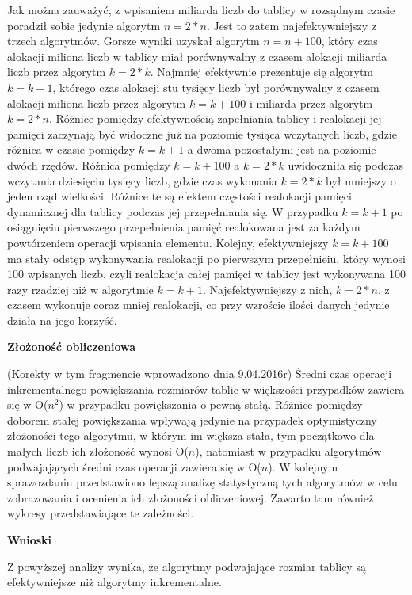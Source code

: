 \documentclass[10pt, a4paper]{article}
\begin{document}
\begin{flushleft}
Jak można zauważyć, z wpisaniem miliarda liczb do tablicy w rozsądnym czasie poradził sobie jedynie algorytm $n=2*n$. Jest to zatem najefektywniejszy z trzech algorytmów. Gorsze wyniki uzyskał algorytm $n=n+100$, który czas alokacji miliona liczb w tablicy miał porównywalny z czasem alokacji miliarda liczb przez algorytm $k=2*k$. Najmniej efektywnie prezentuje się algorytm $k=k+1$, którego czas alokacji stu tysięcy liczb był porównywalny z czasem alokacji miliona liczb przez algorytm $k=k+100$ i miliarda przez algorytm $k=2*n$. Różnice pomiędzy efektywnością zapełniania tablicy i realokacji jej pamięci zaczynają być widoczne już na poziomie tysiąca wczytanych liczb, gdzie różnica w czasie pomiędzy $k=k+1$ a dwoma pozostałymi jest na poziomie dwóch rzędów. Różnica pomiędzy $k=k+100$ a $k=2*k$ uwidoczniła się podczas wczytania dziesięciu tysięcy liczb, gdzie czas wykonania $k=2*k$ był mniejszy o jeden rząd wielkości. Różnice te są efektem częstości realokacji pamięci dynamicznej dla tablicy podczas jej przepełniania się. W przypadku $k=k+1$ po osiągnięciu pierwszego przepełnienia pamięć realokowana jest za każdym powtórzeniem operacji wpisania elementu. Kolejny, efektywniejszy $k=k+100$ ma stały odstęp wykonywania realokacji po pierwszym przepełnieiu, który wynosi 100 wpisanych liczb, czyli realokacja całej pamięci w tablicy jest wykonywana 100 razy rzadziej niż w algorytmie $k=k+1$. Najefektywniejszy z nich, $k=2*n$, z czasem wykonuje coraz mniej realokacji, co przy wzroście ilości danych jedynie działa na jego korzyść. \newline

\textbf{Złożoność obliczeniowa} \newline

(Korekty w tym fragmencie wprowadzono dnia 9.04.2016r) \newline
Średni czas operacji inkrementalnego powiększania rozmiarów tablic w większości przypadków zawiera się w O($n^2$) \newline w przypadku powiększania o pewną stałą. Różnice pomiędzy doborem stałej powiększania wpływają jedynie na przypadek optymistyczny złożoności tego algorytmu, w którym im większa stała, tym początkowo dla małych liczb ich złożoność wynosi O($n$), natomiast w przypadku algorytmów podwajających średni czas operacji zawiera się w O($n$). W kolejnym sprawozdaniu przedstawiono lepszą analizę statystyczną tych algorytmów w celu zobrazowania i ocenienia ich złożoności obliczeniowej. Zawarto tam również wykresy przedstawiające te zależności. \newline


\textbf{Wnioski} \newline

Z powyższej analizy wynika, że algorytmy podwajające rozmiar tablicy są efektywniejsze niż algorytmy inkrementalne.
\end{flushleft}
\end{document}
